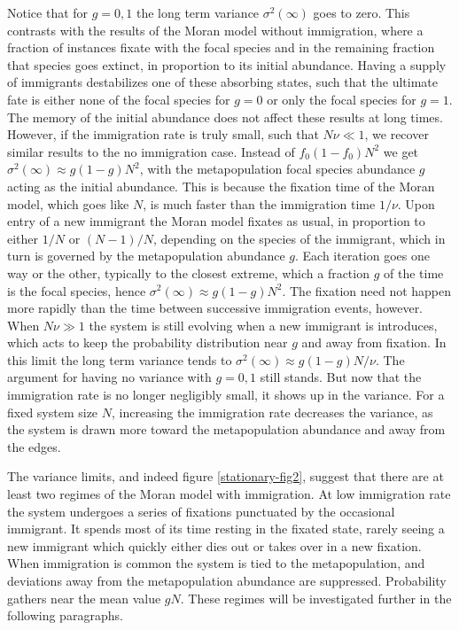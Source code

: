 Notice that for $g=0,1$ the long term variance $\sigma^2(\infty)$ goes to zero. 
This contrasts with the results of the Moran model without immigration, where a fraction of instances fixate with the focal species and in the remaining fraction that species goes extinct, in proportion to its initial abundance. 
Having a supply of immigrants destabilizes one of these absorbing states, such that the ultimate fate is either none of the focal species for $g=0$ or only the focal species for $g=1$. 
The memory of the initial abundance does not affect these results at long times. 
However, if the immigration rate is truly small, such that $N\nu\ll 1$, we recover similar results to the no immigration case. 
Instead of $f_0(1-f_0)N^2$ we get $\sigma^2(\infty) \approx g(1-g) N^2$, with the metapopulation focal species abundance $g$ acting as the initial abundance. 
This is because the fixation time of the Moran model, which goes like $N$, is much faster than the immigration time $1/\nu$. 
Upon entry of a new immigrant the Moran model fixates as usual, in proportion to either $1/N$ or $(N-1)/N$, depending on the species of the immigrant, which in turn is governed by the metapopulation abundance $g$. 
Each iteration goes one way or the other, typically to the closest extreme, which a fraction $g$ of the time is the focal species, hence $\sigma^2(\infty) \approx g(1-g) N^2$. 
The fixation need not happen more rapidly than the time between successive immigration events, however. 
When $N\nu\gg 1$ the system is still evolving when a new immigrant is introduces, which acts to keep the probability distribution near $g$ and away from fixation. 
In this limit the long term variance tends to $\sigma^2(\infty) \approx g(1-g) N/\nu$. 
The argument for having no variance with $g=0,1$ still stands. %
But now that the immigration rate is no longer negligibly small, it shows up in the variance. 
For a fixed system size $N$, increasing the immigration rate decreases the variance, as the system is drawn more toward the metapopulation abundance and away from the edges. 

The variance limits, and indeed figure \ref{stationary-fig2}, suggest that there are at least two regimes of the Moran model with immigration. 
At low immigration rate the system undergoes a series of fixations punctuated by the occasional immigrant. It spends most of its time resting in the fixated state, rarely seeing a new immigrant which quickly either dies out or takes over in a new fixation. 
When immigration is common the system is tied to the metapopulation, and deviations away from the metapopulation abundance are suppressed. 
Probability gathers near the mean value $gN$. 
These regimes will be investigated further in the following paragraphs. 


